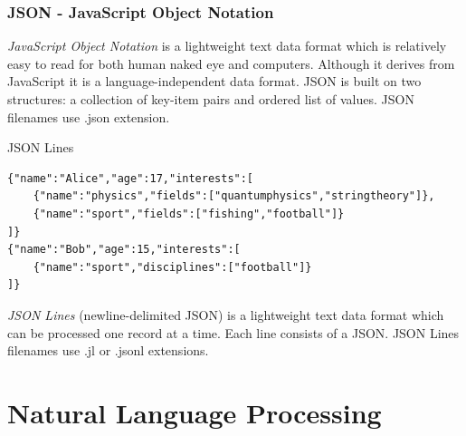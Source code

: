 \documentclass{beamer}
\begin{document}
\begin{frame}
    \frametitle{JSON - JavaScript Object Notation}
    \begin{definition}
        \emph{JavaScript Object Notation} is a lightweight text data format which is relatively easy to read for both human naked eye and computers. Although it derives from JavaScript it is a language-independent data format. JSON is built on two structures: a collection of key-item pairs and ordered list of values. JSON filenames use .json extension.
    \end{definition}
\end{frame}


\begin{frame}[fragile]{JSON Lines}
\begin{verbatim}
{"name":"Alice","age":17,"interests":[
    {"name":"physics","fields":["quantumphysics","stringtheory"]},
    {"name":"sport","fields":["fishing","football"]}
]}
{"name":"Bob","age":15,"interests":[
    {"name":"sport","disciplines":["football"]}
]}
\end{verbatim}
\begin{definition}
    \emph{JSON Lines} (newline-delimited JSON) is a lightweight text data format which can be processed one record at a time. Each line consists of a JSON. JSON Lines filenames use .jl or .jsonl extensions.
\end{definition}
\end{frame}

\section[NLP]{Natural Language Processing}
\end{document}
